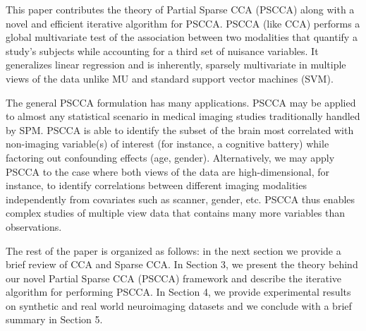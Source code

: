 \documentclass{llncs}
\begin{document}
This paper contributes the theory of Partial Sparse CCA (PSCCA) along
with a novel and efficient iterative algorithm for PSCCA.  PSCCA (like
CCA) performs a global multivariate test of the association between
two modalities that quantify a study's subjects while accounting for a
third set of nuisance variables.  It generalizes linear regression and
is inherently, sparsely multivariate in multiple views of the data
unlike MU and standard support vector machines (SVM).

The general PSCCA formulation has many applications.  PSCCA may be
applied to almost any statistical scenario in medical imaging studies
traditionally handled by SPM.  PSCCA is able to identify the subset of
the brain most correlated with non-imaging variable(s) of interest
(for instance, a cognitive battery) while factoring out confounding
effects (age, gender).  Alternatively, we may apply PSCCA to the case
where both views of the data are high-dimensional, for instance, to
identify correlations between different imaging modalities
independently from covariates such as scanner, gender, etc.  PSCCA
thus enables complex studies of multiple view data that contains many
more variables than observations.

The rest of the paper is organized as follows: in the next section we
provide a brief review of CCA and Sparse CCA. In Section 3, we present
the theory behind our novel Partial Sparse CCA (PSCCA) framework and
describe the iterative algorithm for performing PSCCA. In Section 4,
we provide experimental results on synthetic and real world
neuroimaging datasets and we conclude with a brief summary in Section
5.


\end{document}
